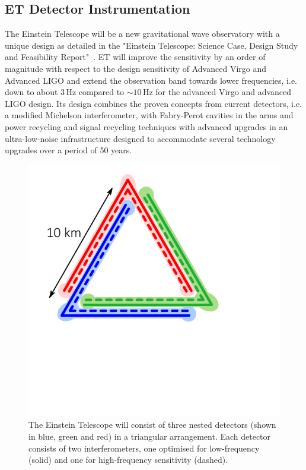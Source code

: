 \documentclass[graybox, nosecnum]{svmult}
\begin{document}
\subsection{ET Detector Instrumentation}
The Einstein Telescope will be a new gravitational wave observatory with a unique design as detailed in the "Einstein Telescope: Science Case, Design Study and Feasibility Report"~\cite{ET_Update}.
ET will improve the sensitivity by an order of magnitude with respect to the design sensitivity of Advanced Virgo and Advanced LIGO and extend the observation band towards lower frequencies, i.e. down to about 3\,Hz compared to $\sim 10$\,Hz for the advanced Virgo and advanced LIGO design.
Its design combines the proven concepts from current detectors, i.e. a
modified Michelson interferometer, with Fabry-Perot cavities in the arms and power recycling and signal recycling techniques with advanced upgrades in an ultra-low-noise infrastructure designed to accommodate several technology upgrades over a period of 50 years.
\begin{figure}[ht]
  \begin{minipage}[t]{0.43\textwidth}
  \vspace{0pt}\hspace{8mm}
    \includegraphics[width=\textwidth]{Figures/ET_simpleB.pdf}
  \end{minipage}\hfill
  \begin{minipage}[t]{0.45\textwidth}
    \caption{
       The Einstein Telescope will consist of three nested detectors (shown in blue, green and red) in a triangular arrangement. Each detector consists of two interferometers, one optimised for low-frequency (solid) and one for high-frequency sensitivity (dashed).
    } \label{fig:NestedDetectors}
  \end{minipage}\hspace{5mm}
 \end{figure}
\end{document}
